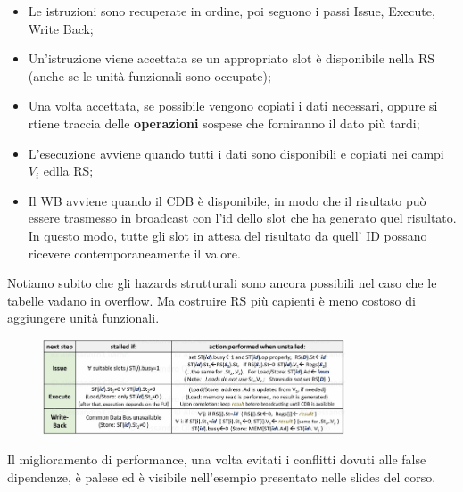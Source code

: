 \begin{itemize}
    \item Le istruzioni sono recuperate in ordine, poi seguono i passi Issue, Execute, Write Back;
    \item Un'istruzione viene accettata se un appropriato slot è disponibile nella RS (anche se le unità funzionali sono occupate);
    \item Una volta accettata, se possibile vengono copiati i dati necessari, oppure si rtiene traccia delle \textbf{operazioni} sospese che forniranno il dato più tardi;
    \item L'esecuzione avviene quando tutti i dati sono disponibili e copiati nei campi $V_i$ edlla RS;
    \item Il WB avviene quando il CDB è disponibile, in modo che il risultato può essere trasmesso in broadcast con l'id dello slot che ha generato quel risultato. In questo modo, tutte gli slot in attesa del risultato da quell' ID possano ricevere contemporaneamente il valore. 
\end{itemize}

\noindent Notiamo subito che gli hazards strutturali sono ancora possibili nel caso che le tabelle vadano in overflow. Ma costruire RS più capienti è meno costoso di aggiungere unità funzionali. 

\begin{figure}[ht]
    \centering
    \includegraphics[width=0.8\textwidth]{fig/chapter_2/tomasulo_transitions.png}
\end{figure}

\noindent Il miglioramento di performance, una volta evitati i conflitti dovuti alle false dipendenze, è palese ed è visibile nell'esempio presentato nelle slides del corso. 

\begin{figure}[ht]
    \centering
    \setlength{\fboxrule}{0.7pt} %
    \setlength{\fboxsep}{0pt}    %
\end{figure}

